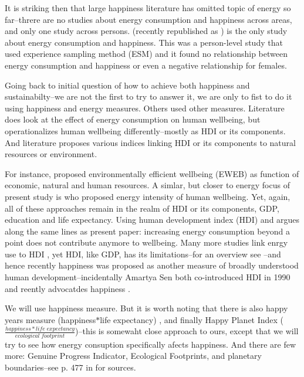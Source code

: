 \documentclass[10pt, letterpaper]{article}
\begin{document}
\begin{spacing}{1.4}
It is striking then that large happiness literature has omitted topic of energy
so far--threre are no studies about energy consumption and happiness across
areas, and only one study across persons.  \citet{graef81} (recently republished
as \citet{csikszentmihalyi14}) is the  only study about energy consumption and
happiness. This was a person-level study that used experience
sampling method (ESM) and it found no relationship between energy consumption
and happiness or even a negative relationship for females. 


Going back to initial question of how to achieve both happiness and
sustainabilty--we are not the first to try to answer it, we are only to fist to
do it using happiness and energy measures. Others used other measures.
Literature does look at the effect of energy consumption on human
wellbeing, but operationalizes human wellbeing differently--mostly as HDI or its
components. And literature proposes various indices linking HDI or its
components to natural resources or environment.

For instance, \citet{dietz09} proposed environmentally efficient wellbeing
(EWEB) as function of economic, natural and human resources. A simlar, but
closer to energy focus of present study is \citet{jorgenson14B} who proposed
energy intensity of human wellbeing. Yet, again, all of these approaches remain
in the realm of HDI or its components, GDP, education and life expectancy. 
 Using human development index (HDI) \citep{steinberger10} and argues along the
 same lines as present paper: increasing energy consumption beyond a point does
 not contribute anymore to wellbeing.  Many more studies link enrgy use to HDI
 \citep[e.g.]{dias06}, yet HDI, like  GDP, has its limitations--for an overview
 see \citet{klugman11}--and hence  recently happiness was proposed as another
 measure of broadly understood human  development--incidentally Amartya Sen both
 co-introduced HDI in 1990 and  reently advocatdes happiness \citep{stiglitz09al}. 

We will use happiness measure. But it is worth noting that there is also
 happy years measure (happiness$*$life expectancy) \citep{veenhoven96B}, and
 finally Happy Planet Index ($\frac{happiness*life\;expectancy}{ecological\;footprint}$)--this is somewaht close approach to  ours, except that we will try to see how energy consuption specifically afects  happiness. And there are few more: Genuine Progress Indicator, Ecological Footprints,  and planetary boundaries--see p. 477 in \citet{pretty13} for  sources. 


\end{spacing}
\end{document}
